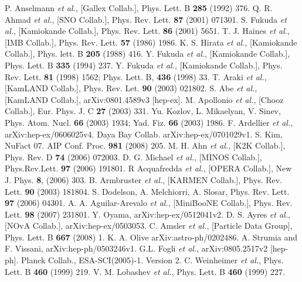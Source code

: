 \begin{thebibliography}{99}
P. Anselmann \textit{et al.}, [Gallex Collab.], Phys. Lett. B \textbf{285} (1992) 376.
Q. R. Ahmad \textit{et al.}, [SNO Collab.], Phys. Rev. Lett. \textbf{87} (2001) 071301.
S. Fukuda \textit{et al.}, [Kamiokande Collab.], Phys. Rev. Lett. \textbf{86} (2001) 5651.
T. J. Haines \textit{et al.}, [IMB Collab.], Phys. Rev. Lett. \textbf{57} (1986) 1986.
K. S. Hirata \textit{et al.}, [Kamiokande Collab.], Phys. lett. B \textbf{205} (1988) 416.
Y. Fukuda \textit{et al.}, [Kamiokande Collab.], Phys. Lett. B \textbf{335} (1994) 237.
Y. Fukuda \textit{et al.}, [Kamiokande Collab.], Phys. Rev. Lett. \textbf{81} (1998) 1562; Phys. Lett. B, \textbf{436} (1998) 33.
T. Araki \textit{et al.}, [KamLAND Collab.], Phys. Rev. Let. \textbf{90} (2003) 021802.
S. Abe \textit{et al.}, [KamLAND Collab.], arXiv:0801.4589v3 [hep-ex].
M. Apollonio \textit{et al.}, [Chooz Collab.], Eur. Phys. J. C \textbf{27} (2003) 331.
Yu. Kozlov, L. Mikaelyan, V. Sinev, Phys. Atom. Nucl. \textbf{66} (2003) 1934; Yad. Fiz. \textbf{66} (2003) 1986.
F. Ardellier \textit{et al.}, arXiv:hep-ex/0606025v4.
Daya Bay Collab. arXiv:hep-ex/0701029v1.
S. Kim, NuFact 07. AIP Conf. Proc. \textbf{981} (2008)   205.
M. H. Ahn \textit{et al.}, [K2K Collab.], Phys. Rev. D  \textbf{74} (2006) 072003.
D. G. Michael \textit{et al.}, [MINOS Collab.], Phys.Rev.Lett. \textbf{97} (2006) 191801.
R Acquafredda \textit{et al.}, [OPERA Collab.], New J. Phys. \textbf{8}, (2006) 303.
B. Armbruster \textit{et al.}, [KARMEN Collab.], Phys. Rev. Lett. \textbf{90} (2003) 181804.
S. Dodelson, A. Melchiorri, A. Slosar, Phys. Rev. Lett. \textbf{97} (2006) 04301.
A. A. Aguilar-Arevalo \textit{et al.}, [MiniBooNE Collab.], Phys. Rev. Lett. \textbf{98} (2007) 231801.
Y. Oyama, arXiv:hep-ex/0512041v2.
D. S. Ayres \textit{et al.}, [NOvA Collab.], arXiv:hep-ex/0503053.
C. Amsler \textit{et al.}, [Particle Data Group], Phys. Lett. B \textbf{667} (2008) 1.
K. A. Olive arXiv:astro-ph/0202486.
A. Strumia and F. Vissani, arXiv:hep-ph/0503246v1.
G.L. Fogli \textit{et al.}, arXiv:0805.2517v2 [hep-ph].
Planck Collab., ESA-SCI(2005)-1. Version 2.
C. Weinheimer \textit{et al.}, Phys. Lett. B \textbf{460} (1999) 219.
V. M. Lobashev \textit{et al.}, Phys. Lett. B \textbf{460} (1999) 227.

\end{thebibliography}
